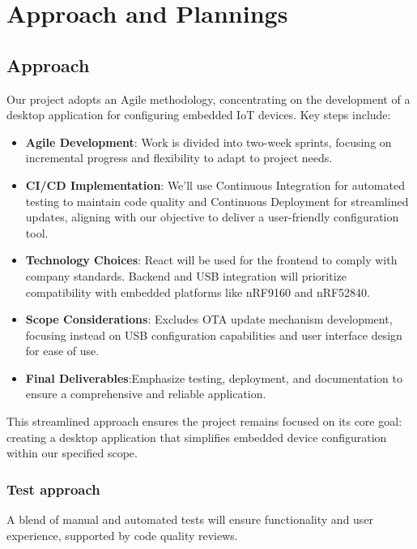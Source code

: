 \documentclass[a4paper, 11pt]{article}
\begin{document}
\pagebreak
\section{Approach and Plannings}
\subsection{Approach}
Our project adopts an Agile methodology, concentrating on the development of a desktop application for configuring embedded IoT devices. Key steps include:
\begin{itemize}
  \item \textbf{Agile Development}: Work is divided into two-week sprints, focusing on incremental progress and flexibility to adapt to project needs.
  \item \textbf{CI/CD Implementation}: We'll use Continuous Integration for automated testing to maintain code quality and Continuous Deployment for streamlined updates, aligning with our objective to deliver a user-friendly configuration tool.
  \item \textbf{Technology Choices}: React will be used for the frontend to comply with company standards. Backend and USB integration will prioritize compatibility with embedded platforms like nRF9160 and nRF52840.
  \item \textbf{Scope Considerations}: Excludes OTA update mechanism development, focusing instead on USB configuration capabilities and user interface design for ease of use.
  \item \textbf{Final Deliverables}:Emphasize testing, deployment, and documentation to ensure a comprehensive and reliable application.
\end{itemize}
This streamlined approach ensures the project remains focused on its core goal: creating a desktop application that simplifies embedded device configuration within our specified scope.
\subsubsection{Test approach}
A blend of manual and automated tests will ensure functionality and user experience, supported by code quality reviews.
\end{document}
